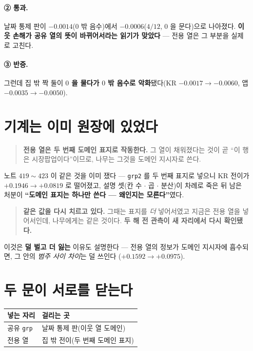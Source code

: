 \documentclass[11pt]{article}
\begin{document}
\paragraph{② 통과.} 날짜 통제 판이 $-0.0014$($0$ 밖 음수)에서
$-0.0006$($4/12$, $0$ 을 문다)으로 나아졌다. \textbf{이웃 손해가 공유 열의
뜻이 바뀌어서라는 읽기가 맞았다} --- 전용 열은 그 부분을 실제로 고친다.

\paragraph{③ 반증.} 그런데 집 밖 짝 둘이 \textbf{$0$ 을 물다가 $0$ 밖
음수로 악화}됐다(KR $-0.0017 \to -0.0060$, 앱 $-0.0035 \to -0.0050$).

\section{기계는 이미 원장에 있었다}

\begin{quote}
\textbf{전용 열은 두 번째 도메인 표지로 작동한다.} 그 열이 채워졌다는 것이
곧 ``이 행은 시장팝업이다''이므로, 나무는 그것을 도메인 지시자로 쓴다.
\end{quote}

노트 $419\!\sim\!423$ 이 같은 것을 이미 쟀다 --- \texttt{grp2} 를 두 번째
표지로 넣으니 KR 전이가 $+0.1946 \to +0.0819$ 로 떨어졌고, 설명 셋(칸 수
$\cdot$ 곱 $\cdot$ 분산)이 차례로 죽은 뒤 남은 처분이 \textbf{``도메인 표지는
하나만 쓴다 --- 왜인지는 모른다''}였다.

\begin{quote}
\textbf{같은 값을 다시 치르고 있다.} 그때는 표지를 \emph{더} 넣어서였고 지금은
전용 열을 넣어서인데, 나무에게는 같은 것이다. \textbf{두 해 전 관측이 새
자리에서 다시 확인됐다.}
\end{quote}

이것은 \textbf{덜 벌고 더 잃는} 이유도 설명한다 --- 전용 열의 정보가
도메인 지시자에 흡수되면, 그 안의 \emph{범주 사이 차이}는 덜 쓰인다
($+0.1592 \to +0.0975$).

\section{두 문이 서로를 닫는다}

\begin{center}
\begin{tabular}{ll}
\hline
넣는 자리 & 걸리는 곳 \\
\hline
공유 \texttt{grp} & 날짜 통제 판(이웃 열 도메인) \\
전용 열 & 집 밖 전이(두 번째 도메인 표지) \\
\hline
\end{tabular}
\end{center}
\end{document}
